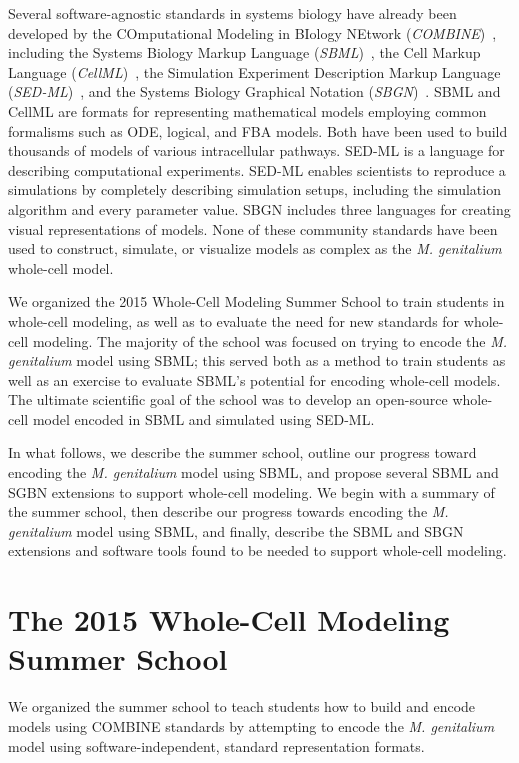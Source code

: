 \documentclass[journal,transmag]{IEEEtran}
\begin{document}
Several software-agnostic standards in systems biology have already been developed by the COmputational Modeling in BIology NEtwork (\emph{COMBINE})~\cite{le2011meeting}, including the Systems Biology Markup Language (\emph{SBML})~\cite{hucka2003}, the Cell Markup Language (\emph{CellML})~\cite{hedley_2001b}, the Simulation Experiment Description Markup Language (\emph{SED-ML})~\cite{sedml2011}, and the Systems Biology Graphical Notation (\emph{SBGN})~\cite{LeNovereHMMSS09}. SBML and CellML are formats for representing mathematical models employing common formalisms such as ODE, logical, and FBA models. Both have been used to build thousands of models of various intracellular pathways. SED-ML is a language for describing computational experiments. SED-ML enables scientists to reproduce a simulations by completely describing simulation setups, including the simulation algorithm and every parameter value. SBGN includes three languages for creating visual representations of models. None of these community standards have been used to construct, simulate, or visualize models as complex as the \textit{M. genitalium} whole-cell model.

We organized the 2015 Whole-Cell Modeling Summer School to train students in whole-cell modeling, as well as to evaluate the need for new standards for whole-cell modeling. The majority of the school was focused on trying to encode the \textit{M. genitalium} model using SBML; this served both as a method to train students as well as an exercise to evaluate SBML's potential for encoding whole-cell models. The ultimate scientific goal of the school was to develop an open-source whole-cell model encoded in SBML and simulated using SED-ML.

In what follows, we describe the summer school, outline our progress toward encoding the \textit{M. genitalium} model using SBML, and propose several SBML and SGBN extensions to support whole-cell modeling. We begin with a summary of the summer school, then describe our progress towards encoding the \textit{M. genitalium} model using SBML, and finally, describe the SBML and SBGN extensions and software tools found to be needed to support whole-cell modeling.

\section{The 2015 Whole-Cell Modeling Summer School}
We organized the summer school to teach students how to build and encode models using COMBINE standards by attempting to encode the \textit{M. genitalium} model using software-independent, standard representation formats.
\end{document}
